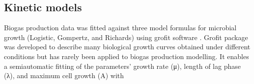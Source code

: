 \subsection{Kinetic models}
Biogas production data was fitted against three model formulas for microbial growth (Logistic, Gompertz, and Richards) using grofit software \cite{Kahm_2010}. Grofit package was developed to describe many biological growth curves obtained under different conditions but has rarely been applied to biogas production modelling. It enables a semiautomatic fitting of the parameters’ growth rate (μ), length of lag phase (λ), and maximum cell growth (A) with 